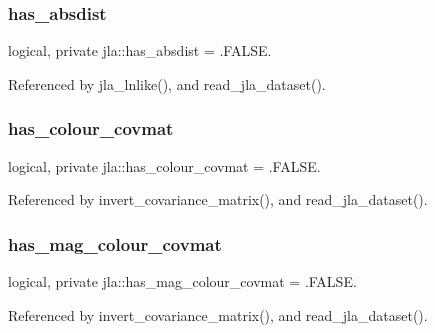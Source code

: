 \mbox{\label{namespacejla_a2eb95509fe329afa263dcfa2727d6b41}} 
\subsubsection{\texorpdfstring{has\+\_\+absdist}{has\_absdist}}
{\footnotesize\ttfamily logical, private jla\+::has\+\_\+absdist = .F\+A\+L\+S\+E.\hspace{0.3cm}{\ttfamily [private]}}



Referenced by jla\+\_\+lnlike(), and read\+\_\+jla\+\_\+dataset().

\mbox{\label{namespacejla_a5f77e309102810deed32022b4986fcd7}} 
\subsubsection{\texorpdfstring{has\+\_\+colour\+\_\+covmat}{has\_colour\_covmat}}
{\footnotesize\ttfamily logical, private jla\+::has\+\_\+colour\+\_\+covmat = .F\+A\+L\+S\+E.\hspace{0.3cm}{\ttfamily [private]}}



Referenced by invert\+\_\+covariance\+\_\+matrix(), and read\+\_\+jla\+\_\+dataset().

\mbox{\label{namespacejla_aab6bb8e29688907bcdf528d8aeb19f04}} 
\subsubsection{\texorpdfstring{has\+\_\+mag\+\_\+colour\+\_\+covmat}{has\_mag\_colour\_covmat}}
{\footnotesize\ttfamily logical, private jla\+::has\+\_\+mag\+\_\+colour\+\_\+covmat = .F\+A\+L\+S\+E.\hspace{0.3cm}{\ttfamily [private]}}



Referenced by invert\+\_\+covariance\+\_\+matrix(), and read\+\_\+jla\+\_\+dataset().

